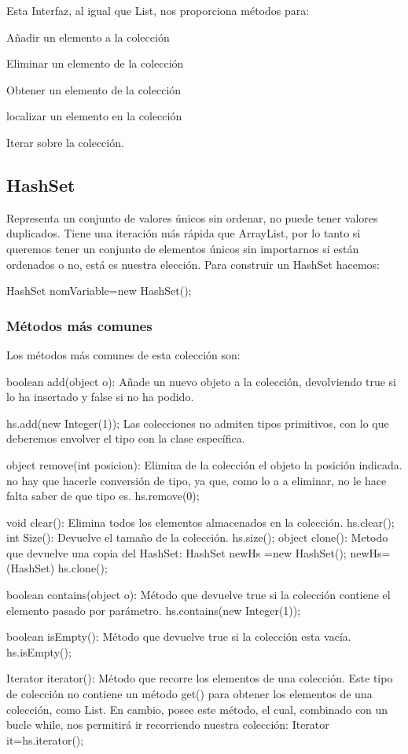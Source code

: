 \documentclass[12pt,a4paper]{report}
\begin{document}
{Esta Interfaz, al igual que List, nos proporciona métodos para:

Añadir un elemento a la colección

Eliminar un elemento de la colección

Obtener un elemento de la colección

localizar un elemento en la colección

Iterar sobre la colección.
\subsection*{HashSet}
Representa un conjunto de valores únicos sin ordenar, no puede tener valores duplicados. Tiene una iteración más rápida que ArrayList, por lo tanto si queremos tener un conjunto de elementos únicos sin importarnos si están ordenados o no, está es nuestra elección.
Para construir un HashSet hacemos:

HashSet nomVariable=new HashSet();
\subsubsection*{Métodos más comunes}
Los métodos más comunes de esta colección son:

boolean add(object o): Añade un nuevo objeto a la colección, devolviendo true si lo ha insertado y false si no ha podido.

hs.add(new Integer(1)); Las colecciones no admiten tipos primitivos, con lo que deberemos envolver el tipo con la clase específica.

object remove(int posicion): Elimina de la colección el objeto la posición indicada. no hay que hacerle conversión de tipo, ya que, como lo a a eliminar, no le hace falta saber de que tipo es.
		hs.remove(0);
		
void clear(): Elimina todos los elementos almacenados en la colección.
		hs.clear();
int Size(): Devuelve el tamaño de la colección. 
		hs.size();
object clone(): Metodo que devuelve una copia del HashSet:
		HashSet newHs =new HashSet();
		newHs=(HashSet) hs.clone();
		 
boolean contains(object o): Método que devuelve true si la colección contiene el elemento pasado por parámetro.
		hs.contains(new Integer(1));

boolean isEmpty(): Método que devuelve true si la colección esta vacía.
		hs.isEmpty();
		
Iterator iterator(): Método que recorre los elementos de una colección.
Este tipo de colección no contiene un método get() para obtener los elementos de una colección, como List. En cambio, posee este método, el cual, combinado con un bucle while, nos permitirá ir recorriendo nuestra colección:
Iterator it=hs.iterator();

}
\end{document}
